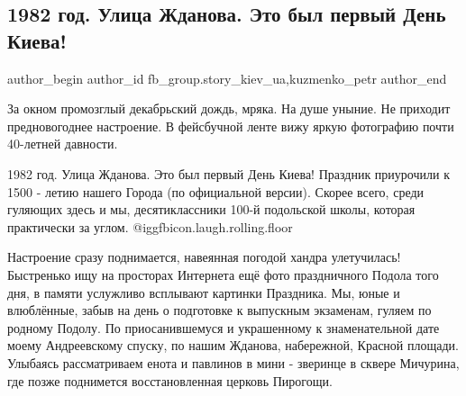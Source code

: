  
 
 
 
 
 
\subsection{1982 год. Улица Жданова. Это был первый День Киева!}
\label{sec:15_12_2021.fb.fb_group.story_kiev_ua.1.den_kieva_1982}
 
\ifcmt
 author_begin
   author_id fb_group.story_kiev_ua,kuzmenko_petr
 author_end
\fi

За окном промозглый декабрьский дождь, мряка. На душе уныние. Не приходит
предновогоднее настроение. В фейсбучной ленте вижу яркую фотографию почти
40-летней давности. 

\begin{multicols}{2} %
\setlength{\parindent}{0pt}


\end{multicols} %

1982 год. Улица Жданова. Это был первый День Киева! Праздник приурочили к 1500
- летию нашего Города (по официальной версии). Скорее всего, среди гуляющих
здесь и мы, десятиклассники 100-й подольской школы, которая практически за
углом. @igg{fbicon.laugh.rolling.floor}  

Настроение сразу поднимается, навеянная погодой хандра улетучилась! Быстренько
ищу на просторах Интернета ещё фото праздничного Подола того дня, в памяти
услужливо всплывают картинки Праздника. Мы, юные и влюблённые, забыв на день о
подготовке к выпускным экзаменам, гуляем по родному Подолу. По приосанившемуся
и украшенному к знаменательной дате моему Андреевскому спуску, по нашим
Жданова, набережной, Красной площади. Улыбаясь рассматриваем енота и павлинов в
мини - зверинце в сквере Мичурина, где позже поднимется восстановленная церковь
Пирогощи. 

